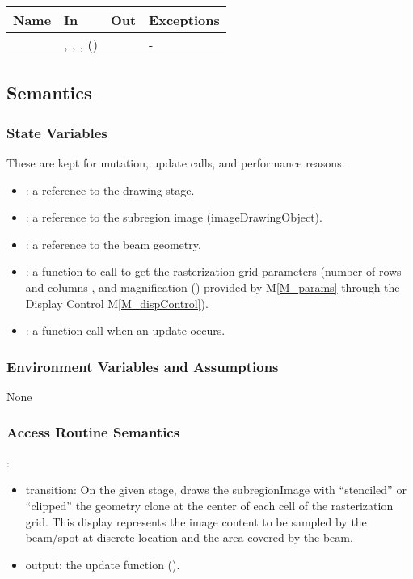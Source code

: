 \documentclass[12pt, titlepage]{article}
\newcommand{\mref}[1]{M\ref{#1}}
\begin{document}
\begin{center}
\begin{tabular}{L{5cm} L{4cm} L{4cm} L{2cm}}
\hline
\textbf{Name} & \textbf{In} & \textbf{Out} & \textbf{Exceptions} \\
\hline
{} & , , ,
   () &  & - \\
\hline
\end{tabular}
\end{center}

\subsection{Semantics}

\subsubsection{State Variables}
These are kept for mutation, update calls, and performance reasons.
\begin{itemize}
  \item {}: a reference to the drawing stage.
  \item {}: a reference to the subregion image (imageDrawingObject).
  \item {}: a reference to the beam geometry.
  \item {}: a function to call to get the rasterization
    grid parameters (number of rows  and columns ,
    and magnification () 
    provided by \mref{M_params}
    through the Display Control \mref{M_dispControl}).
  \item {}: a function call when an update occurs.
\end{itemize}

\subsubsection{Environment Variables and Assumptions}
None

\subsubsection{Access Routine Semantics}

\noindent {}:
\begin{itemize}
\item transition: On the given stage, draws the subregionImage with ``stenciled''
  or ``clipped'' the  geometry clone at the center of each cell
  of the rasterization grid. This display represents
  the image content to be sampled by the beam/spot at discrete location
  and the area covered by the beam.
\item output: the update function ().
\end{itemize}
\end{document}
